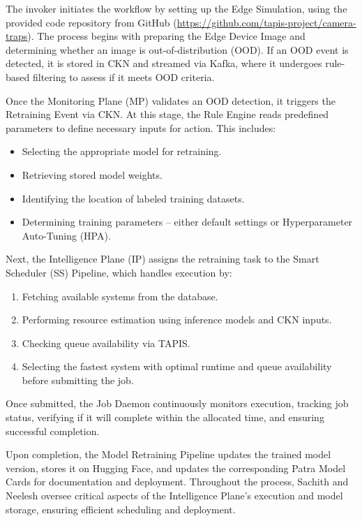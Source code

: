 The invoker initiates the workflow by setting up the Edge Simulation, using the provided code repository from GitHub (\url{https://github.com/tapis-project/camera-traps}). The process begins with preparing the Edge Device Image and determining whether an image is out-of-distribution (OOD). If an OOD event is detected, it is stored in CKN and streamed via Kafka, where it undergoes rule-based filtering to assess if it meets OOD criteria.

Once the Monitoring Plane (MP) validates an OOD detection, it triggers the Retraining Event via CKN. At this stage, the Rule Engine reads predefined parameters to define necessary inputs for action. This includes:
\begin{itemize}
    \item Selecting the appropriate model for retraining.
    \item Retrieving stored model weights.
    \item Identifying the location of labeled training datasets.
    \item Determining training parameters – either default settings or Hyperparameter Auto-Tuning (HPA).
\end{itemize}

Next, the Intelligence Plane (IP) assigns the retraining task to the Smart Scheduler (SS) Pipeline, which handles execution by:
\begin{enumerate}
    \item Fetching available systems from the database.
    \item Performing resource estimation using inference models and CKN inputs.
    \item Checking queue availability via TAPIS.
    \item Selecting the fastest system with optimal runtime and queue availability before submitting the job.
\end{enumerate}

Once submitted, the Job Daemon continuously monitors execution, tracking job status, verifying if it will complete within the allocated time, and ensuring successful completion.

Upon completion, the Model Retraining Pipeline updates the trained model version, stores it on Hugging Face, and updates the corresponding Patra Model Cards for documentation and deployment. Throughout the process, Sachith and Neelesh oversee critical aspects of the Intelligence Plane’s execution and model storage, ensuring efficient scheduling and deployment.


